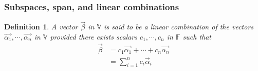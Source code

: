 \documentclass{article}
\newtheorem*{definition}{Definition}
\begin{document}
    \subsubsection{Subspaces, span, and linear combinations}
    \begin{definition}
        A vector \(\vec{\beta}\) in \(\mathbb{V}\) is said to be a linear combination of
        the vectors \(\vec{\alpha_{1}}, \cdots, \vec{\alpha_{n}}\) in \(\mathbb{V}\) provided there
        exists scalars \(c_{1}, \cdots, c_{n}\) in \(\mathbb{F}\) such that 
        \begin{equation*}
            \begin{split}
                \vec{\beta}&=c_{1} \vec{\alpha_{1}} + \cdots + c_{n} \vec{\alpha_n} \\ &= \sum_{i=1}^{n} c_{i} \vec{\alpha}_{i}
            \end{split}
        \end{equation*}
    \end{definition}
\end{document}
